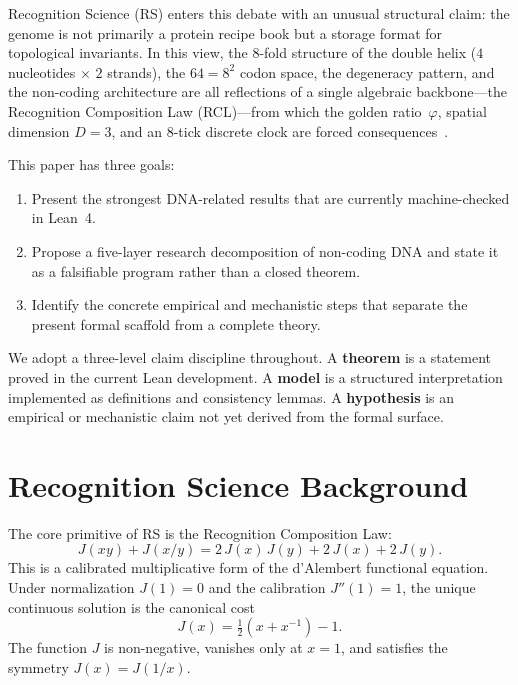 \documentclass[11pt,a4paper]{article}
\newcommand{\Jcost}{J}
\newcommand{\ph}{\varphi}
\begin{document}
Recognition Science (RS) enters this debate with an unusual structural claim: the genome is not primarily a protein recipe book but a storage format for topological invariants. In this view, the 8-fold structure of the double helix ($4$ nucleotides $\times$ $2$ strands), the $64 = 8^2$ codon space, the degeneracy pattern, and the non-coding architecture are all reflections of a single algebraic backbone---the Recognition Composition Law (RCL)---from which the golden ratio~$\ph$, spatial dimension $D=3$, and an 8-tick discrete clock are forced consequences~\cite{Washburn2025}.

This paper has three goals:
\begin{enumerate}[nosep]
\item Present the strongest DNA-related results that are currently machine-checked in Lean~4.
\item Propose a five-layer research decomposition of non-coding DNA and state it as a falsifiable program rather than a closed theorem.
\item Identify the concrete empirical and mechanistic steps that separate the present formal scaffold from a complete theory.
\end{enumerate}

We adopt a three-level claim discipline throughout. A \textbf{theorem} is a statement proved in the current Lean development. A \textbf{model} is a structured interpretation implemented as definitions and consistency lemmas. A \textbf{hypothesis} is an empirical or mechanistic claim not yet derived from the formal surface.

\section{Recognition Science Background}
\label{sec:background}

The core primitive of RS is the Recognition Composition Law:
\begin{equation}
\label{eq:rcl}
\Jcost(xy) + \Jcost(x/y) = 2\,\Jcost(x)\,\Jcost(y) + 2\,\Jcost(x) + 2\,\Jcost(y).
\end{equation}
This is a calibrated multiplicative form of the d'Alembert functional equation. Under normalization $\Jcost(1)=0$ and the calibration $\Jcost''(1)=1$, the unique continuous solution is the canonical cost
\begin{equation}
\label{eq:jcanon}
\Jcost(x) = \tfrac{1}{2}(x + x^{-1}) - 1.
\end{equation}
The function $\Jcost$ is non-negative, vanishes only at $x=1$, and satisfies the symmetry $\Jcost(x)=\Jcost(1/x)$.
\end{document}
